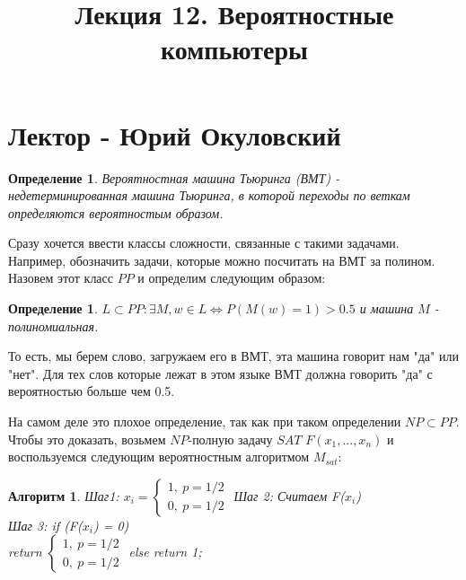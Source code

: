 \documentclass{beamer}
\title{Лекция 12. Вероятностные компьютеры}
\theoremstyle{plain}
\newtheorem{dfn}[thm]{Определение}
\newtheorem{alg}[thm]{Алгоритм}
\theoremstyle{definition}
\begin{document}


\section{Лектор - Юрий Окуловский}
\begin{frame}
    \begin{dfn}
        Вероятностная машина Тьюринга (ВМТ) - недетерминированная машина Тьюринга, в которой переходы по веткам определяются вероятностым образом.
    \end{dfn}
    Сразу хочется ввести классы сложности, связанные с такими задачами. Например, обозначить задачи, которые можно посчитать на ВМТ за полином. Назовем этот класс $PP$ и определим следующим образом:
    \begin{dfn}
        $ L \subset PP : \exists M, w \in L \Leftrightarrow P(M(w)=1)>0.5$ и машина $M$ - полиномиальная.
    \end{dfn}
    То есть, мы берем слово, загружаем его в ВМТ, эта машина говорит нам "да" или "нет". Для тех слов которые лежат в этом языке ВМТ должна говорить "да" с вероятностью больше чем 0.5.
\end{frame}

\begin{frame}
    На самом деле это плохое определение, так как при таком определении $ NP\subset PP $. Чтобы это доказать, возьмем $NP$-полную задачу $SAT$ $F(x_1, ... , x_n) $ и воспользуемся следующим вероятностным алгоритмом $M_{sat}$:
    \begin{alg}
        Шаг1: $x_i=\left\{\begin{array}{l}1,\ p=1/2\\0,\ p=1/2\end{array}\right.$
        Шаг 2: Считаем F($x_i$) \\
        Шаг 3: if (F($x_i$) = 0) \\
            return $\left\{\begin{array}{l}1,\ p=1/2\\0,\ p=1/2\end{array}\right.$
        else return 1;
    \end{alg}
\end{frame}
\end{document}
